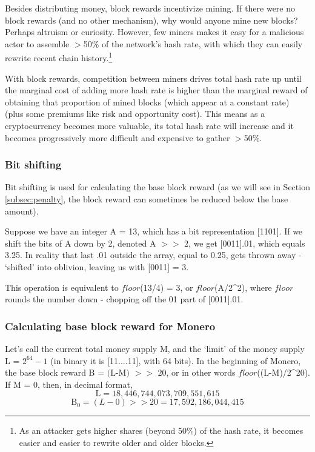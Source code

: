 Besides distributing money, block rewards incentivize mining. If there were no block rewards (and no other mechanism), why would anyone mine new blocks? Perhaps altruism or curiosity. However, few miners makes it easy for a malicious actor to assemble $>$50\% of the network's hash rate, with which they can easily rewrite recent chain history.\footnote{As an attacker gets higher shares (beyond 50\%) of the hash rate, it becomes easier and easier to rewrite older and older blocks.}

With block rewards, competition between miners drives total hash rate up until the marginal cost of adding more hash rate is higher than the marginal reward of obtaining that proportion of mined blocks (which appear at a constant rate) (plus some premiums like risk and opportunity cost). This means as a cryptocurrency becomes more valuable, its total hash rate will increase and it becomes progressively more difficult and expensive to gather $>$50\%.


\subsubsection*{Bit shifting}

Bit shifting is used for calculating the base block reward (as we will see in Section \ref{subsec:penalty}, the block reward can sometimes be reduced below the base amount). 

Suppose we have an integer A = 13, which has a bit representation [1101]. If we shift the bits of A down by 2, denoted A $>>$ 2, we get [0011].01, which equals 3.25. In reality that last .01 outside the array, equal to 0.25, gets thrown away - `shifted' into oblivion, leaving us with [0011] = 3. 

This operation is equivalent to $\mathit{floor}$(13/4) = 3, or $\mathit{floor}$(A/2\^{}2), where $\mathit{floor}$ rounds the number down - chopping off the 01 part of [0011].01.

        
\subsubsection*{Calculating base block reward for Monero}

Let's call the current total money supply M, and the `limit' of the money supply L = $2^{64} - 1$ (in binary it is [11....11], with 64 bits). In the beginning of Monero, the base block reward \(\textrm{B = (L-M) $>>$ 20}\), or in other words $\mathit{floor}$((L-M)/2\^{}20). If M = 0, then, in decimal format,\vspace{.2cm}
\[ \textrm{L} = 18,446,744,073,709,551,615 \]
\[ \textrm{B}_0 = (L-0) >> 20 = 17,592,186,044,415 \]

